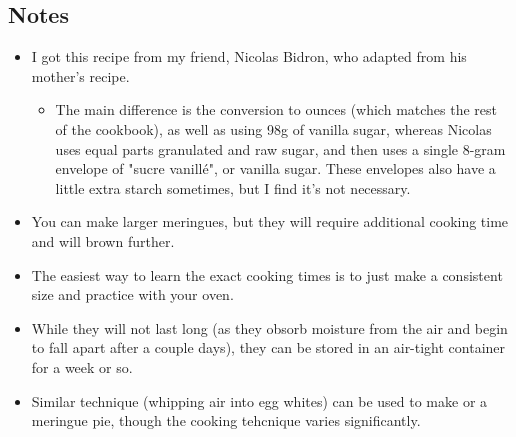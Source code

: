 \begin{multicols}{2}
\subsection*{Notes}
\begin{itemize}
    \item I got this recipe from my friend, Nicolas Bidron, who adapted from his mother's recipe.
    \begin{itemize}
        \item The main difference is the conversion to ounces (which matches the rest of the cookbook), as well as using 98g of vanilla sugar, whereas Nicolas uses equal parts granulated and raw sugar, and then uses a single 8-gram envelope of "sucre vanillé", or vanilla sugar. These envelopes also have a little extra starch sometimes, but I find it's not necessary.
    \end{itemize}
    \item You can make larger meringues, but they will require additional cooking time and will brown further.
    \item The easiest way to learn the exact cooking times is to just make a consistent size and practice with your oven.
    \item While they will not last long (as they obsorb moisture from the air and begin to fall apart after a couple days), they can be stored in an air-tight container for a week or so.
    \item Similar technique (whipping air into egg whites) can be used to make  or a meringue pie, though the cooking tehcnique varies significantly.
\end{itemize}
\end{multicols}
\clearpage